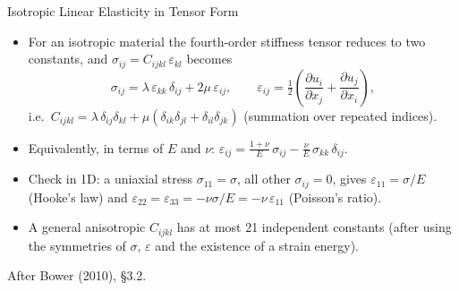 \documentclass[aspectratio=169,11pt]{beamer}
\begin{document}
\begin{frame}{Isotropic Linear Elasticity in Tensor Form}
  \begin{itemize}
    \item For an isotropic material the fourth-order stiffness tensor reduces to two constants, and $\sigma_{ij} = C_{ijkl}\,\varepsilon_{kl}$ becomes
      \[
        \sigma_{ij} = \lambda\,\varepsilon_{kk}\,\delta_{ij} + 2\mu\,\varepsilon_{ij},
        \qquad
        \varepsilon_{ij} = \tfrac12\left(\frac{\partial u_i}{\partial x_j} + \frac{\partial u_j}{\partial x_i}\right),
      \]
      i.e.\ $C_{ijkl} = \lambda\,\delta_{ij}\delta_{kl} + \mu(\delta_{ik}\delta_{jl} + \delta_{il}\delta_{jk})$ (summation over repeated indices).
    \item Equivalently, in terms of $E$ and $\nu$:
      \(
        \varepsilon_{ij} = \frac{1+\nu}{E}\,\sigma_{ij} - \frac{\nu}{E}\,\sigma_{kk}\,\delta_{ij}.
      \)
    \item Check in 1D: a uniaxial stress $\sigma_{11}=\sigma$, all other $\sigma_{ij}=0$, gives $\varepsilon_{11} = \sigma/E$ (Hooke's law) and $\varepsilon_{22}=\varepsilon_{33} = -\nu\sigma/E = -\nu\,\varepsilon_{11}$ (Poisson's ratio).
    \item A general anisotropic $C_{ijkl}$ has at most 21 independent constants (after using the symmetries of $\sigma$, $\varepsilon$ and the existence of a strain energy).
  \end{itemize}
  \vspace{1mm}
  {\tiny\color{DarkGray}After Bower (2010), \S3.2.\par}
\end{frame}
\end{document}
